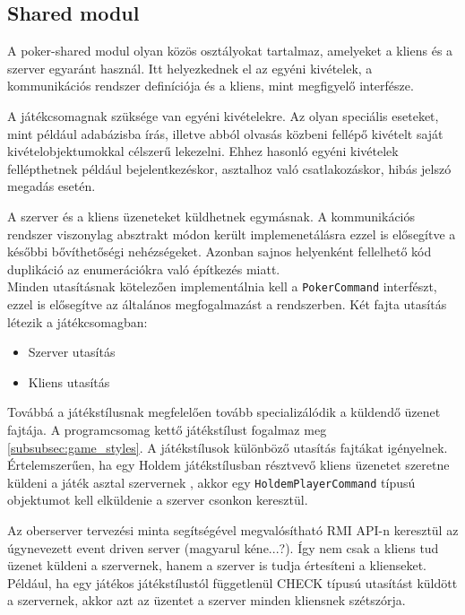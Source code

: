 \subsection{Shared modul}
A poker-shared modul olyan közös osztályokat tartalmaz, amelyeket a kliens és a szerver egyaránt használ. Itt helyezkednek el az egyéni kivételek, a kommunikációs rendszer definíciója és a kliens, mint megfigyelő interfésze.

A játékcsomagnak szüksége van egyéni kivételekre. Az olyan speciális eseteket, mint például adabázisba írás, illetve abból olvasás közbeni fellépő kivételt saját kivételobjektumokkal célszerű lekezelni. Ehhez hasonló egyéni kivételek fellépthetnek például bejelentkezéskor, asztalhoz való csatlakozáskor, hibás jelszó megadás esetén.

A szerver és a kliens üzeneteket küldhetnek egymásnak. A kommunikációs rendszer viszonylag absztrakt módon került implemenetálásra ezzel is elősegítve a későbbi bővíthetőségi nehézségeket. Azonban sajnos helyenként fellelhető kód duplikáció az enumerációkra való építkezés miatt. \\
Minden utasításnak kötelezően implementálnia kell a \texttt{PokerCommand} interfészt, ezzel is elősegítve az általános megfogalmazást a rendszerben. Két fajta utasítás létezik a játékcsomagban:
\begin{itemize}[leftmargin=2cm]
	\item Szerver utasítás
	\item Kliens utasítás
\end{itemize}
Továbbá a játékstílusnak megfelelően tovább specializálódik a küldendő üzenet fajtája. A programcsomag kettő játékstílust fogalmaz meg \ref{subsubsec:game_styles}. A játékstílusok különböző utasítás fajtákat igényelnek. Értelemszerűen, ha egy Holdem játékstílusban résztvevő kliens üzenetet szeretne küldeni a játék asztal szervernek , akkor egy \texttt{HoldemPlayerCommand} típusú objektumot kell elküldenie a szerver csonkon keresztül.

Az oberserver tervezési minta segítségével megvalósítható RMI API-n keresztül az úgynevezett event driven server (magyarul kéne...?). Így nem csak a kliens tud üzenet küldeni a szervernek, hanem a szerver is tudja értesíteni a klienseket. Például, ha egy játékos játékstílustól függetlenül CHECK típusú utasítást küldött a szervernek, akkor azt az üzentet a szerver minden kliensnek szétszórja.

